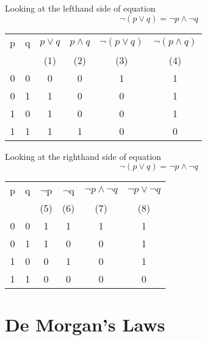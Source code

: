 \documentclass[12pt]{article} %
\begin{document}
\noindent	Looking at the lefthand side of equation
{\LARGE	\[  \neg (p \vee q) = \neg p \wedge \neg q\]
}	
\bigskip
{
	\Large
\begin{center}
	\begin{tabular}{|c|c||c|c|c|c|}
		\hline
		p	&	q	&	$ p \vee q$	&	$ p \wedge q$&	$\neg (p \vee q)$	&	$\neg (p \wedge q)$\\
		&		&	(1)	&	(2)	&	(3)	&	(4)	\\ \hline
		\phantom{sp}0\phantom{sp}	&	\phantom{sp}0\phantom{sp}	&	\phantom{sp}0\phantom{sp}	&	\phantom{sp}0\phantom{sp}	&	1	&	1 \\
		0	&	1	&	1	&	0	&	0	&	1\\
		1	&	0	&	1	&	0	&	0	&	1\\
		1	&	1	&	1	&	1	&	\phantom{sp}0\phantom{sp}	&	\phantom{sp}0\phantom{sp}\\
		\hline
	\end{tabular}
\end{center}
}
\bigskip
\noindent	Looking at the righthand side of equation
	\[  \neg (p \vee q) = \neg p \wedge \neg q\]
	\begin{center}
		\begin{tabular}{|c|c||c|c|c|c|}
			\hline
			p	&	q	&	$\neg$p	&	$\neg$q	&	$\neg p \wedge \neg q$	&	$\neg p \vee \neg q$ \\ 
			&		&	(5)	&	(6)	&	(7)	&	(8)	\\
			\hline
			\phantom{sp}0\phantom{sp}	&	\phantom{sp}0\phantom{sp}	&	1	&	1	&	1	&	1	\\
			0	&	1	&	1	&	0	&	0	&	1	\\
			1	&	0	&	0	&	1	&	0	&	1	\\
			1	&	1	&	\phantom{sp}0\phantom{sp}	&	\phantom{sp}0\phantom{sp}	&	\phantom{sp}0\phantom{sp}	&	\phantom{sp}0\phantom{sp}	\\
			\hline
		\end{tabular}
	\end{center}
\newpage
\section{De Morgan's Laws}


\end{document}
